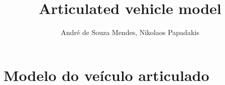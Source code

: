 \documentclass[sublist]{fei}
\author{André de Souza Mendes, Nikolaos Papadakis}
\title{Articulated vehicle model}
\begin{document}
\maketitle












\section{Modelo do veículo articulado}
\end{document}
